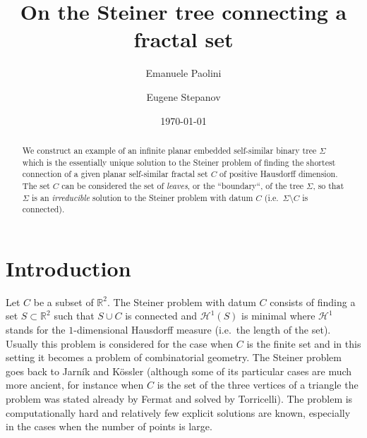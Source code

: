 \documentclass{amsart}
\author[Paolini]{Emanuele Paolini}
\author[Stepanov]{Eugene Stepanov}
\date{\today}
\title{On the Steiner tree connecting a fractal set}
\newcommand{\RR}{\mathbb R}
\renewcommand{\H}{\mathcal H}
\renewcommand{\H}{\mathcal{H}}
\theoremstyle{definition}
\theoremstyle{remark}
\begin{document}
\begin{abstract}
We construct an example of an infinite planar embedded self-similar binary tree  
$\Sigma$ which is the essentially unique solution to the Steiner problem of finding 
the shortest connection of a given planar self-similar fractal set $C$
of positive Hausdorff dimension.
The set $C$ can be considered the set of \emph{leaves}, or the ``boundary``,
of the tree $\Sigma$,
so that $\Sigma$ is an \emph{irreducible} solution to the Steiner problem
with datum $C$ (i.e.\ $\Sigma\setminus C$ is connected).
\end{abstract}

\maketitle

\section{Introduction}

Let $C$ be a subset of $\RR^2$.
The Steiner problem with datum $C$ consists of finding a set $S\subset \RR^2$ 
such that $S\cup C$ is connected and $\H^1(S)$ is minimal where $\H^1$ stands 
for the $1$-dimensional Hausdorff measure (i.e.\ the length of the set).
Usually this problem is considered for the case when $C$ is the finite 
set and in this setting it becomes a problem of combinatorial geometry. 
The Steiner problem goes back to Jarník and Kössler \cite{JarKos34} 
(although some of its particular cases are much more ancient, for instance 
when $C$ is the set of the three vertices of a triangle the problem was 
stated already by Fermat and solved by Torricelli).
The problem is computationally hard and relatively few explicit solutions 
are known, especially in the cases when the number of points is large.
\end{document}
